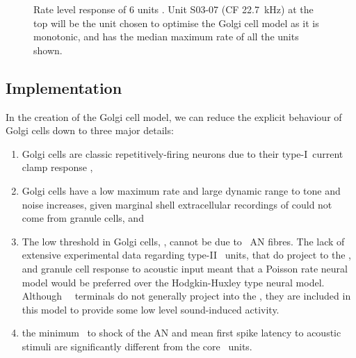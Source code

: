 
 \begin{figure}[htp!]
   \centering
  \caption[Rate level response of marginal shell units]{Rate level response of 6 units \citep[from
    Fig.~2]{GhoshalKim:1997}. Unit S03-07 (CF 22.7~kHz) at the top
    will be the unit chosen to optimise the Golgi cell model as it is
    monotonic, and has the median maximum rate of all the units
    shown.}\label{fig:GolgiKimFig2}
\end{figure}

\subsection{Implementation}\label{sec:Golgi:implementation}

In the creation of the Golgi cell model, we can reduce the explicit
behaviour of Golgi cells down to three major details:
 \begin{enumerate}
 \item Golgi cells are classic repetitively-firing neurons due to their
   type-I~current clamp response \citep{FerragamoGoldingEtAl:1998},
 \item Golgi cells have a low maximum rate and large dynamic range to tone and
   noise increases, given marginal shell extracellular recordings of
   \citet{GhoshalKim:1997} could not come from granule cells, and
 \item The low threshold in Golgi cells, \citet{GhoshalKim:1997}, cannot be due
   to \LSR~AN fibres. The lack of extensive experimental data regarding type-II
   \ANF~units, that do project to the \GCD, and granule cell response to
   acoustic input meant that a Poisson rate neural model would be preferred over
   the Hodgkin-Huxley type neural model.  Although \HSR~\ANF~terminals do not
   generally project into the \GCD, they are included in this model to provide
   some low level sound-induced activity.
 \item the minimum \EPSP~to shock of the AN \citep{FerragamoGoldingEtAl:1998}
   and mean first spike latency to acoustic stimuli \citep{GhoshalKim:1997} are
   significantly different from the core \VCN~units.
 \end{enumerate}



